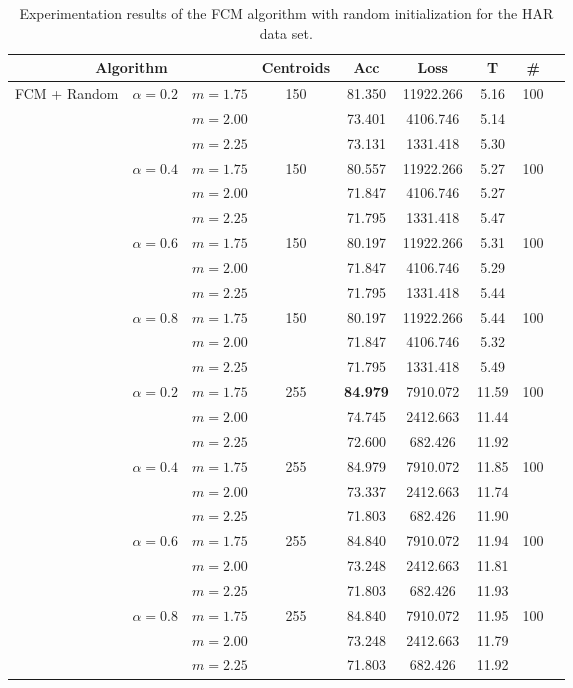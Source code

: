 \begin{table}[h!]
  \centering
\caption{Experimentation results of the FCM algorithm with random initialization for the HAR data set.}
\label{tab:har2}
\begin{tabular}{ccccccccc}
\hline
\multicolumn{3}{c}{Algorithm} & Centroids & Acc & Loss & T & \# \\ \hline
\multirow{24}{*}{FCM + Random} & \multirow{3}{*}{$\alpha = 0.2$} & $m=1.75$ & \multirow{3}{*}{150} & 81.350 & 11922.266 & 5.16 & \multirow{3}{*}{100} \\
 &  & $m=2.00$ &  & 73.401 & 4106.746 & 5.14 &\\
 &  & $m=2.25$ &  & 73.131 & 1331.418 & 5.30 &\\ \cline{2-8}
 & \multirow{3}{*}{$\alpha = 0.4$} & $m=1.75$ & \multirow{3}{*}{150} & 80.557 & 11922.266 & 5.27 &\multirow{3}{*}{100}\\
 &  & $m=2.00$ &  & 71.847 & 4106.746 & 5.27 &\\
 &  & $m=2.25$ &  & 71.795 & 1331.418 & 5.47 &\\ \cline{2-8}
 & \multirow{3}{*}{$\alpha = 0.6$} & $m=1.75$ & \multirow{3}{*}{150} & 80.197 & 11922.266 & 5.31 &\multirow{3}{*}{100}\\
 &  & $m=2.00$ &  & 71.847 & 4106.746 & 5.29 &\\
 &  & $m=2.25$ &  & 71.795 & 1331.418 & 5.44 &\\ \cline{2-8}
 & \multirow{3}{*}{$\alpha = 0.8$} & $m=1.75$ & \multirow{3}{*}{150} & 80.197 & 11922.266 & 5.44 &\multirow{3}{*}{100}\\
 &  & $m=2.00$ &  & 71.847 & 4106.746 & 5.32 &\\
 &  & $m=2.25$ &  & 71.795 & 1331.418 & 5.49 &\\ \cline{2-8}
 & \multirow{3}{*}{$\alpha = 0.2$} & $m=1.75$ & \multirow{3}{*}{255} & \textbf{84.979} & 7910.072 & 11.59 &\multirow{3}{*}{100}\\
 &  & $m=2.00$ &  & 74.745 & 2412.663 & 11.44 &\\
 &  & $m=2.25$ &  & 72.600 & 682.426 & 11.92 &\\ \cline{2-8}
 & \multirow{3}{*}{$\alpha = 0.4$} & $m=1.75$ & \multirow{3}{*}{255} & 84.979 & 7910.072 & 11.85 &\multirow{3}{*}{100}\\
 &  & $m=2.00$ &  & 73.337 & 2412.663 & 11.74 &\\
 &  & $m=2.25$ &  & 71.803 & 682.426 & 11.90 &\\\cline{2-8}
 & \multirow{3}{*}{$\alpha = 0.6$} & $m=1.75$ & \multirow{3}{*}{255} & 84.840 & 7910.072 & 11.94 &\multirow{3}{*}{100}\\
 &  & $m=2.00$ &  & 73.248 & 2412.663 & 11.81 &\\
 &  & $m=2.25$ &  & 71.803 & 682.426 & 11.93 &\\\cline{2-8}
 & \multirow{3}{*}{$\alpha = 0.8$} & $m=1.75$ & \multirow{3}{*}{255} & 84.840 & 7910.072 & 11.95 &\multirow{3}{*}{100}\\
 &  & $m=2.00$ &  & 73.248 & 2412.663 & 11.79 &\\
 &  & $m=2.25$ &  & 71.803 & 682.426 & 11.92 &\\ \hline
\end{tabular}
\end{table}

